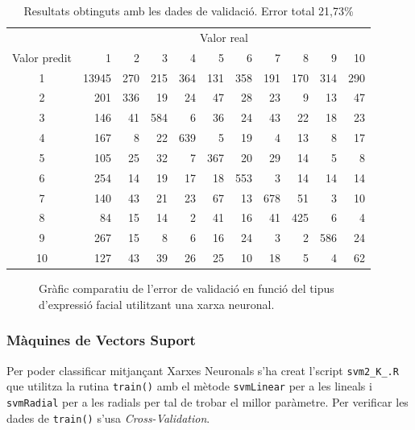 \documentclass[a4paper]{article}
\begin{document}
\begin{table}[H]
	\centering
	\def\arraystretch{1.2}
	\begin{tabular}{|c|rrrrrrrrrr|}
		\hline
		& \multicolumn{10}{c|}{Valor real} \\
		Valor predit & 1 & 2 & 3 & 4 & 5 & 6 & 7 & 8 & 9 & 10 \\
		\hline
		1 & 13945 & 270 & 215 & 364 & 131 & 358 & 191 & 170 & 314 & 290 \\
		2 & 201 & 336 & 19 & 24 & 47 & 28 & 23 & 9 & 13 & 47 \\
		3 & 146 & 41 & 584 & 6 & 36 & 24 & 43 & 22 & 18 & 23 \\
		4 & 167 & 8 & 22 & 639 & 5 & 19 & 4 & 13 & 8 & 17 \\
		5 & 105 & 25 & 32 & 7 & 367 & 20 & 29 & 14 & 5 & 8 \\
		6 & 254 & 14 & 19 & 17 & 18 & 553 & 3 & 14 & 14 & 14 \\
		7 & 140 & 43 & 21 & 23 & 67 & 13 & 678 & 51 & 3 & 10 \\
		8 & 84 & 15 & 14 & 2 & 41 & 16 & 41 & 425 & 6 & 4 \\
		9 & 267 & 15 & 8 & 6 & 16 & 24 & 3 & 2 & 586 & 24 \\
		10 & 127 & 43 & 39 & 26 & 25 & 10 & 18 & 5 & 4 & 62 \\
		\hline
	\end{tabular}
	\caption{Resultats obtinguts amb les dades de validació. Error total 21,73\%}
	\label{tab:nnet_k2}
\end{table}

\begin{figure}[H]
	\centering
	\captionsetup{width=0.8\textwidth}
	\caption{Gràfic comparatiu de l'error de validació en funció del tipus d'expressió facial utilitzant una xarxa neuronal.}
\end{figure}

\subsubsection{Màquines de Vectors Suport}
Per poder classificar mitjançant Xarxes Neuronals s'ha creat l'script \verb|svm2_K_.R| que utilitza la rutina \verb|train()| amb el mètode \verb|svmLinear| per a les lineals i \verb|svmRadial| per a les radials per tal de trobar el millor paràmetre. Per verificar les dades de \verb|train()| s'usa \emph{Cross-Validation}.
\end{document}
